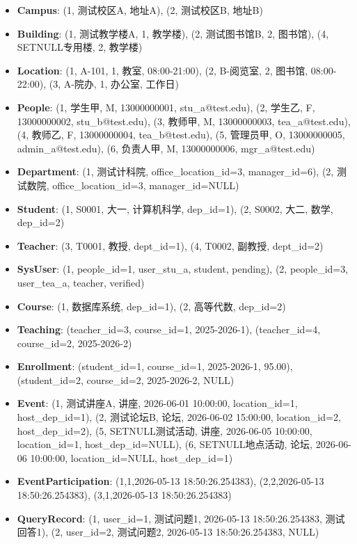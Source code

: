 \documentclass[11pt, a4paper]{article}
\begin{document}
\begin{itemize}
    \item \textbf{Campus}: (1, 测试校区A, 地址A), (2, 测试校区B, 地址B)
    \item \textbf{Building}: (1, 测试教学楼A, 1, 教学楼), (2, 测试图书馆B, 2, 图书馆), (4, SETNULL专用楼, 2, 教学楼)
    \item \textbf{Location}: (1, A-101, 1, 教室, 08:00-21:00), (2, B-阅览室, 2, 图书馆, 08:00-22:00), (3, A-院办, 1, 办公室, 工作日)
    \item \textbf{People}: (1, 学生甲, M, 13000000001, stu\_a@test.edu), (2, 学生乙, F, 13000000002, stu\_b@test.edu), (3, 教师甲, M, 13000000003, tea\_a@test.edu), (4, 教师乙, F, 13000000004, tea\_b@test.edu), (5, 管理员甲, O, 13000000005, admin\_a@test.edu), (6, 负责人甲, M, 13000000006, mgr\_a@test.edu)
    \item \textbf{Department}: (1, 测试计科院, office\_location\_id=3, manager\_id=6), (2, 测试数院, office\_location\_id=3, manager\_id=NULL)
    \item \textbf{Student}: (1, S0001, 大一, 计算机科学, dep\_id=1), (2, S0002, 大二, 数学, dep\_id=2)
    \item \textbf{Teacher}: (3, T0001, 教授, dept\_id=1), (4, T0002, 副教授, dept\_id=2)
    \item \textbf{SysUser}: (1, people\_id=1, user\_stu\_a, student, pending), (2, people\_id=3, user\_tea\_a, teacher, verified)
    \item \textbf{Course}: (1, 数据库系统, dep\_id=1), (2, 高等代数, dep\_id=2)
    \item \textbf{Teaching}: (teacher\_id=3, course\_id=1, 2025-2026-1), (teacher\_id=4, course\_id=2, 2025-2026-2)
    \item \textbf{Enrollment}: (student\_id=1, course\_id=1, 2025-2026-1, 95.00), (student\_id=2, course\_id=2, 2025-2026-2, NULL)
    \item \textbf{Event}: (1, 测试讲座A, 讲座, 2026-06-01 10:00:00, location\_id=1, host\_dep\_id=1), (2, 测试论坛B, 论坛, 2026-06-02 15:00:00, location\_id=2, host\_dep\_id=2), (5, SETNULL测试活动, 讲座, 2026-06-05 10:00:00, location\_id=1, host\_dep\_id=NULL), (6, SETNULL地点活动, 论坛, 2026-06-06 10:00:00, location\_id=NULL, host\_dep\_id=1)
    \item \textbf{EventParticipation}: (1,1,2026-05-13 18:50:26.254383), (2,2,2026-05-13 18:50:26.254383), (3,1,2026-05-13 18:50:26.254383)
    \item \textbf{QueryRecord}: (1, user\_id=1, 测试问题1, 2026-05-13 18:50:26.254383, 测试回答1), (2, user\_id=2, 测试问题2, 2026-05-13 18:50:26.254383, NULL)
\end{itemize}
\end{document}
